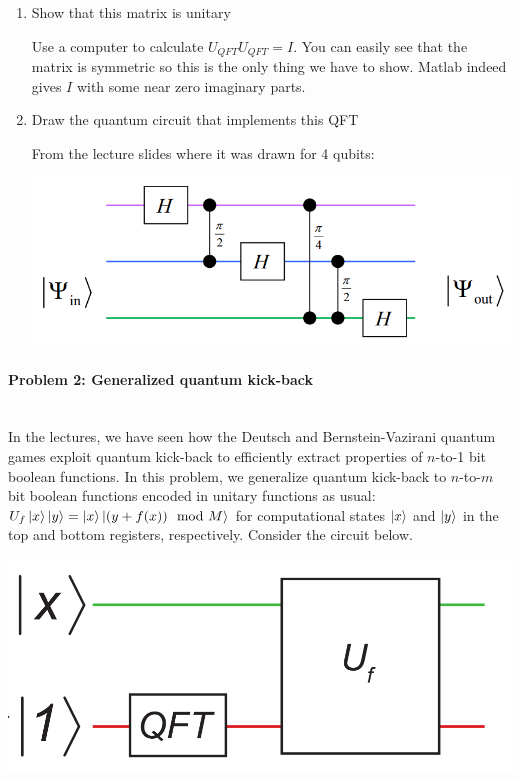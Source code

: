 \documentclass[12pt]{article}
\newenvironment{answer}{\begingroup\setlength{\leftskip}{-\leftmargin}\begin{framed}}{\end{framed}\endgroup}
\begin{document}
\begin{enumerate}
    \item Show that this matrix is unitary

    \begin{answer}
        Use a computer to calculate $U_{QFT}U_{QFT} = I$. You can easily see that the matrix is symmetric so this is the only thing we have to show.
        Matlab indeed gives $I$ with some near zero imaginary parts.
    \end{answer}

    \item Draw the quantum circuit that implements this QFT

    \begin{answer}
        From the lecture slides where it was drawn for 4 qubits:
        \begin{center}\includegraphics[width=.8\textwidth]{problem-1.png}\end{center}
    \end{answer}

\end{enumerate}

\paragraph{Problem 2: Generalized quantum kick-back} \hfill \\

In the lectures, we have seen how the Deutsch and Bernstein-Vazirani quantum games exploit quantum kick-back to efficiently extract properties of $n$-to-1 bit boolean functions. In this problem, we generalize quantum kick-back to $n$-to-$m$ bit boolean functions encoded in unitary functions as usual: $U_f\ket{x}\ket{y} = \ket{x}\ket{(y + f(x)) \mod M}$ for computational states $\ket{x}$ and $\ket{y}$ in the top and bottom registers, respectively. Consider the circuit below.

\begin{center}\includegraphics[width=.5\textwidth]{problem-2.png}\end{center}
\end{document}
